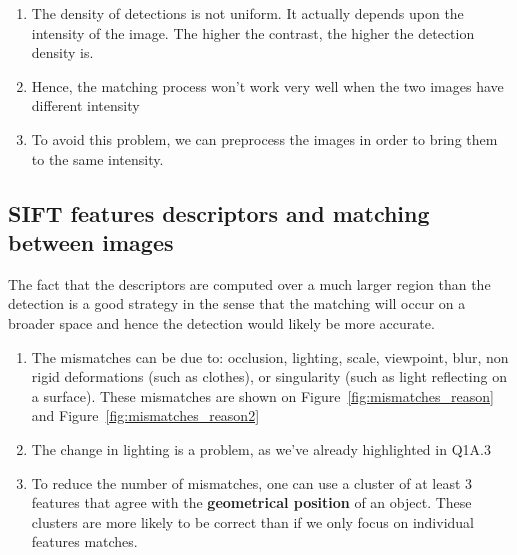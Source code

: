 \documentclass{article}
\begin{document}

\begin{enumerate}
\item The density of detections is not uniform. It actually depends upon the intensity of the image. The higher the contrast, the higher the detection density is.
\item Hence, the matching process won't work very well when the two images have different intensity
\item To avoid this problem, we can preprocess the images in order to bring them to the same intensity.
\end{enumerate}

\subsection{SIFT features descriptors and matching between images}

The fact that the descriptors are computed over a much larger region than the detection is a good strategy in the sense that the matching will occur on a broader space and hence the detection would likely be more accurate.


\begin{enumerate}
\item The mismatches can be due to: occlusion, lighting, scale, viewpoint, blur, non rigid deformations (such as clothes), or singularity (such as light reflecting on a surface). These mismatches are shown on Figure~\ref{fig:mismatches_reason} and Figure~\ref{fig:mismatches_reason2}
\item The change in lighting is a problem, as we've already highlighted in Q1A.3
\item To reduce the number of mismatches, one can use a cluster of at least 3 features that agree with the \textbf{geometrical position} of an object. These clusters are more likely to be correct than if we only focus on individual features matches.
\end{enumerate}
\end{document}

